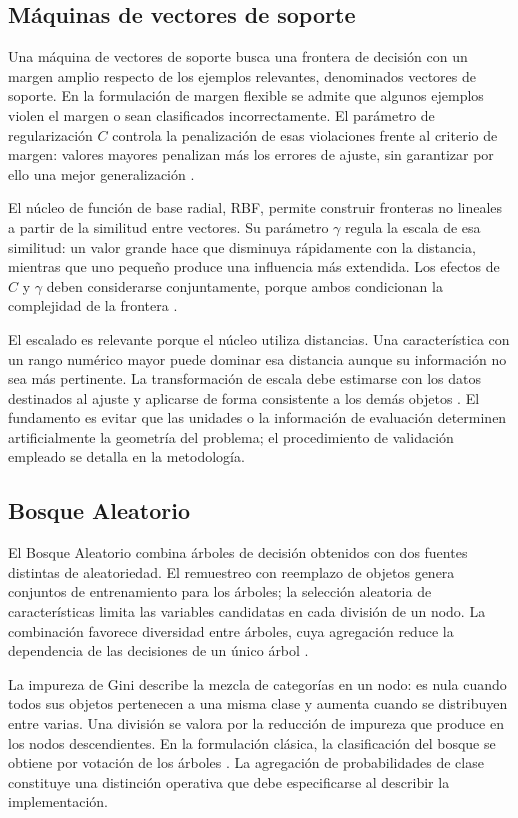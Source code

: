 \subsection{Máquinas de vectores de soporte}
Una máquina de vectores de soporte busca una frontera de decisión con un margen amplio respecto de los ejemplos relevantes, denominados vectores de soporte. En la formulación de margen flexible se admite que algunos ejemplos violen el margen o sean clasificados incorrectamente. El parámetro de regularización $C$ controla la penalización de esas violaciones frente al criterio de margen: valores mayores penalizan más los errores de ajuste, sin garantizar por ello una mejor generalización \parencite{cortes1995}.

El núcleo de función de base radial, RBF, permite construir fronteras no lineales a partir de la similitud entre vectores. Su parámetro $\gamma$ regula la escala de esa similitud: un valor grande hace que disminuya rápidamente con la distancia, mientras que uno pequeño produce una influencia más extendida. Los efectos de $C$ y $\gamma$ deben considerarse conjuntamente, porque ambos condicionan la complejidad de la frontera \parencite{hsu2025}.

El escalado es relevante porque el núcleo utiliza distancias. Una característica con un rango numérico mayor puede dominar esa distancia aunque su información no sea más pertinente. La transformación de escala debe estimarse con los datos destinados al ajuste y aplicarse de forma consistente a los demás objetos \parencite{hsu2025}. El fundamento es evitar que las unidades o la información de evaluación determinen artificialmente la geometría del problema; el procedimiento de validación empleado se detalla en la metodología.

\subsection{Bosque Aleatorio}
El Bosque Aleatorio combina árboles de decisión obtenidos con dos fuentes distintas de aleatoriedad. El remuestreo con reemplazo de objetos genera conjuntos de entrenamiento para los árboles; la selección aleatoria de características limita las variables candidatas en cada división de un nodo. La combinación favorece diversidad entre árboles, cuya agregación reduce la dependencia de las decisiones de un único árbol \parencite{breiman2001}.

La impureza de Gini describe la mezcla de categorías en un nodo: es nula cuando todos sus objetos pertenecen a una misma clase y aumenta cuando se distribuyen entre varias. Una división se valora por la reducción de impureza que produce en los nodos descendientes. En la formulación clásica, la clasificación del bosque se obtiene por votación de los árboles \parencite{breiman2001}. La agregación de probabilidades de clase constituye una distinción operativa que debe especificarse al describir la implementación.

